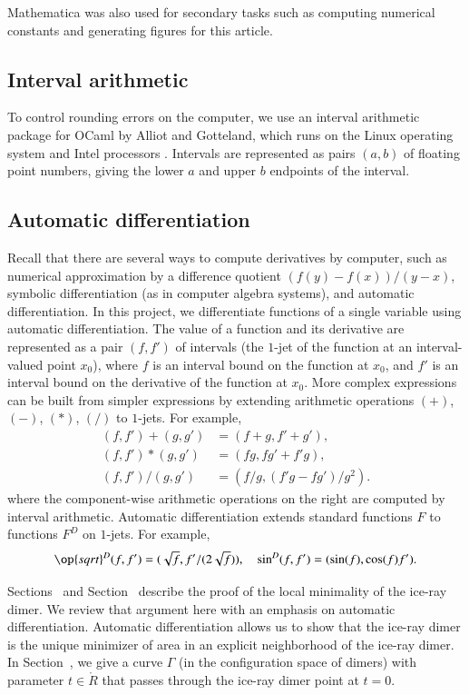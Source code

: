 Mathematica was also used for secondary tasks such as computing numerical
constants and generating figures for this article.


\subsection{Interval arithmetic}

To control rounding errors on the computer, we use an interval
arithmetic package for OCaml by Alliot and Gotteland, which runs on
the Linux operating system and Intel processors \cite{All}.  Intervals
are represented as pairs $(a,b)$ of floating point numbers, giving the
lower $a$ and upper $b$ endpoints of the interval.


\subsection{Automatic differentiation}

Recall that there are several ways to compute derivatives by computer,
such as numerical approximation by a difference quotient
$(f(y)-f(x))/(y-x)$, symbolic differentiation (as in computer algebra
systems), and automatic differentiation.  In this project, we
differentiate functions of a single variable using automatic
differentiation.  The value of a function and its derivative are
represented as a pair $(f,f')$ of intervals (the $1$-jet of the
function at an interval-valued point $x_0$), where $f$ is an interval
bound on the function at $x_0$, and $f'$ is an interval bound on the
derivative of the function at $x_0$.  More complex expressions can be
built from simpler expressions by extending arithmetic operations
$(+)$, $(-)$, $(*)$, $(/)$ to $1$-jets.  For example,
\begin{align*}
(f,f') + (g,g') &= (f+g,f'+g'),\\
(f,f') * (g,g') &= (f g,f g' + f' g),\\
(f,f') / (g,g') &= (f / g, (f' g - f g')/g^2).
\end{align*}
where the component-wise arithmetic operations on the right are
computed by interval arithmetic.  Automatic differentiation extends
standard functions $F$ to functions $F^D$ on $1$-jets.
For example,
\[
\op{sqrt}^D(f,f') = (\sqrt{f}, f'/(2\sqrt{f})),\quad 
\sin^D (f,f') = (\sin(f), \cos(f) f').
\]

Sections~ and Section~ describe
the proof of the local minimality of the ice-ray dimer.  We review
that argument here with an emphasis on automatic differentiation.
Automatic differentiation allows us to show that the ice-ray dimer is
the unique minimizer of area in an explicit neighborhood of the
ice-ray dimer.  In Section~, we give a curve
$\Gamma$ (in the configuration space of dimers) with parameter
$t\in\ring{R}$ that passes through the ice-ray dimer point at $t=0$.

